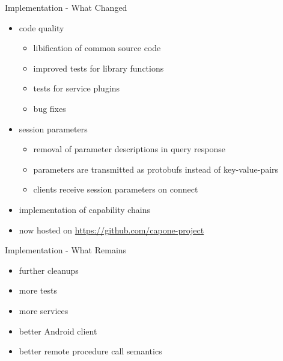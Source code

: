 \documentclass[a4paper]{beamer}
\begin{document}
\begin{frame}{Implementation - What Changed}
    \begin{itemize}
        \item code quality
            \begin{itemize}
                \item libification of common source code
                \item improved tests for library functions
                \item tests for service plugins
                \item bug fixes
            \end{itemize}
        \item session parameters
            \begin{itemize}
                \item removal of parameter descriptions in query response
                \item parameters are transmitted as protobufs instead of key-value-pairs
                \item clients receive session parameters on connect
            \end{itemize}
        \item implementation of capability chains
        \item now hosted on \url{https://github.com/capone-project}
    \end{itemize}
\end{frame}

\begin{frame}{Implementation - What Remains}
    \begin{itemize}
        \item further cleanups
        \item more tests
        \item more services
        \item better Android client
        \item better remote procedure call semantics
    \end{itemize}
\end{frame}
\end{document}
